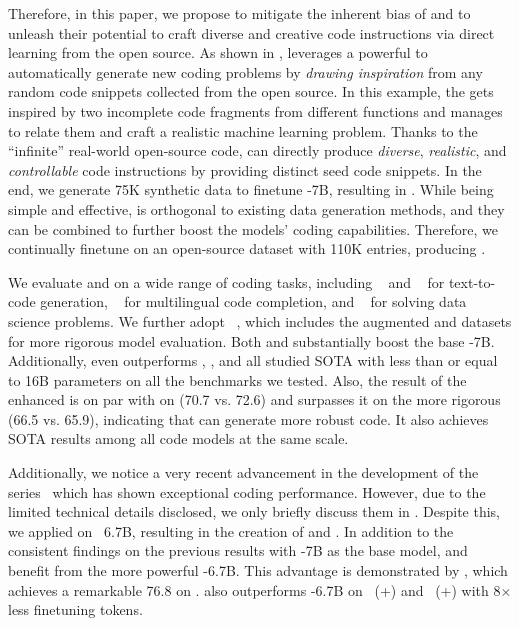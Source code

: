 Therefore, in this paper, we propose \tech{} to mitigate the inherent bias of  and to unleash their potential to craft diverse and creative code instructions via direct learning from the open source.
As shown in , \tech{} leverages a powerful \llm{} to automatically generate new coding problems by \emph{drawing inspiration} from any random code snippets collected from the open source.
In this example, the \llm{} gets inspired by two incomplete code fragments from different functions and manages to relate them and craft a realistic machine learning problem.
Thanks to the ``infinite'' real-world open-source code, \tech{} can directly produce \emph{diverse}, \emph{realistic}, and \emph{controllable} code instructions by providing distinct seed code snippets.
In the end, we generate 75K synthetic data to finetune \codellamapy{}-7B, resulting in \modelc{}.
While being simple and effective, \tech{} is orthogonal to existing data generation methods, and they can be combined to further boost the models' coding capabilities. 
Therefore, we continually finetune \modelc{} on an open-source \evolinstruct{} dataset with 110K entries, producing \modelxc{}.

We evaluate \model{} and \modelx{} on a wide range of coding tasks, including \humaneval~\cite{codex} and \mbpp~\cite{synthesisllm} for \python{} text-to-code generation,
\multiple~\cite{multiple} for multilingual code completion,
and \dsonek~\cite{ds1000} for solving data science problems.
We further adopt \evalplus~\cite{liu2023code}, which includes the augmented \humanevalp{} and \mbppp{} datasets for more rigorous model evaluation. 
Both \modelc{} and \modelxc{} substantially boost the base \codellamapy-7B. Additionally, \modelc{} even outperforms , , and all studied SOTA  with less than or equal to 16B parameters on all the benchmarks we tested.
Also, the  result of the enhanced \modelxc{} is on par with \chatgpt{} on \humaneval{} (70.7 vs. 72.6) and surpasses it on the more rigorous \humanevalp{} (66.5 vs. 65.9), indicating that \modelxc{} can generate more robust code.
It also achieves SOTA results among all code models at the same scale.

Additionally, we notice a very recent advancement in the development of the \dscoder{} series~\cite{dscoder} which has shown exceptional coding performance.
However, due to the limited technical details disclosed, we only briefly discuss them in .
Despite this, we applied \tech{} on \dscoderbase~6.7B, resulting in the creation of \modeld{} and \modelxd{}.
In addition to the consistent findings on the previous results with \codellamapy{}-7B as the base model,
\modeld{} and \modelxd{} benefit from the more powerful \dscoderbase-6.7B.
This advantage is demonstrated by \modelxd, which achieves a remarkable 76.8  on \humaneval.
\modelxd{} also outperforms \dscoderinst-6.7B on \humaneval~(+) and \mbpp~(+) with 8$\times$ less finetuning tokens.

